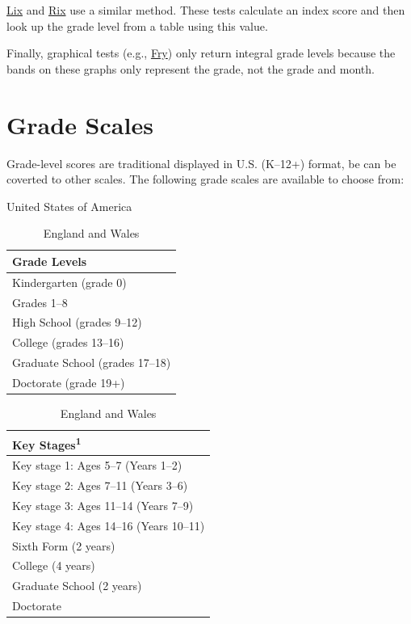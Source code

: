 \documentclass[
]{book}
\theoremstyle{definition}
\theoremstyle{definition}
\theoremstyle{definition}
\theoremstyle{definition}
\theoremstyle{remark}
\begin{document}
\protect\hyperlink{lix-test}{Lix} and \protect\hyperlink{rix-test}{Rix} use a similar method. These tests calculate an index score and then look up the grade level from a table using this value.

Finally, graphical tests (e.g., \protect\hyperlink{fry-test}{Fry}) only return integral grade levels because the bands on these graphs only represent the grade, not the grade and month.

\hypertarget{grade-scales}{%
\section{Grade Scales}\label{grade-scales}}

Grade-level scores are traditional displayed in U.S. (K--12+) format, be can be coverted to other scales. The following grade scales are available to choose from:

\begin{table}[!htb]
    \begin{minipage}{.5\linewidth}
      \caption{United States of America}
\begin{tabular}[t]{l}
\toprule
Grade Levels\\
\midrule
Kindergarten (grade 0)\\
Grades 1–8\\
High School (grades 9–12)\\
College (grades 13–16)\\
Graduate School (grades 17–18)\\
Doctorate (grade 19+)\\
\bottomrule
\end{tabular}\hspace{1cm}
    \end{minipage}%
    \hspace{.1cm}
    \begin{minipage}{.5\linewidth}
      \caption{England and Wales}
\begin{tabular}[t]{l}
\toprule
Key Stages\textsuperscript{1}\\
\midrule
Key stage 1: Ages 5–7 (Years 1–2)\\
Key stage 2: Ages 7–11 (Years 3–6)\\
Key stage 3: Ages 11–14 (Years 7–9)\\
Key stage 4: Ages 14–16 (Years 10–11)\\
Sixth Form (2 years)\\
College (4 years)\\
Graduate School (2 years)\\
Doctorate\\
\bottomrule
\end{tabular}  
    \end{minipage}
    \end{table}
\end{document}
